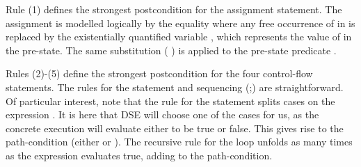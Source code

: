 \documentclass{IOS-Book-Article}
\begin{document}
\begin{mdP}[data-line={491}]%
{}Rule (1) defines the strongest postcondition for 
the assignment statement. The assignment is modelled
logically by the equality %
{}%
{} where any free occurrence of %
{}%
{} in %
{}%
{}
is replaced by the existentially quantified variable %
{}%
{}, which represents
the value of %
{}%
{} in the pre-state. The same substitution (%
{}\mdSpan[class={math-inline},elem={math-inline}]{$[x \rightarrow y ]$}%
{})
is applied to the pre-state predicate %
{}%
{}.%
\end{mdP}%
\begin{mdP}[class={indent},data-line={498}]%
{}Rules (2)-(5) define the strongest postcondition for the four control-flow
statements. The rules for the %
{}%
{} statement and sequencing (;) are
straightforward. 
Of particular interest, note that the rule for the %
{}%
{} 
statement splits cases on the expression %
{}%
{}. 
It is here that DSE will choose one of the cases for us, as the concrete
execution will evaluate %
{}%
{} either to be true or false. This gives rise
to the path-condition (either %
{}%
{} or %
{}%
{}). The
recursive rule for the %
{}%
{} loop unfolds as many times as the
expression %
{}%
{} evaluates true, adding to the path-condition.%
\end{mdP}%
\end{document}
